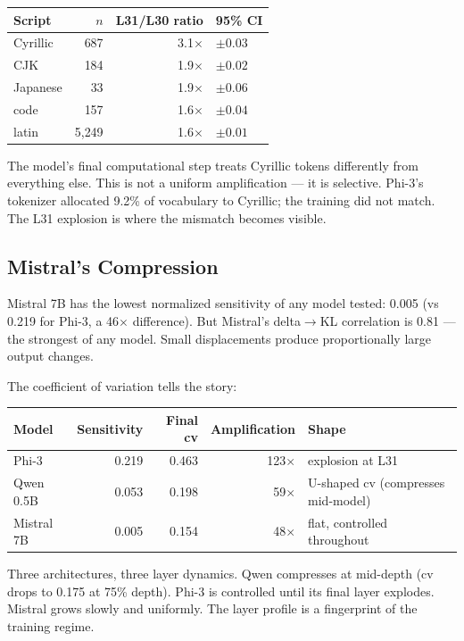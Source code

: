 \documentclass[11pt,a4paper]{article}
\begin{document}
\begin{center}
\begin{tabular}{lrrl}
\toprule
\textbf{Script} & \textbf{$n$} & \textbf{L31/L30 ratio} & \textbf{95\% CI} \\
\midrule
Cyrillic & 687 & 3.1$\times$ & $\pm 0.03$ \\
CJK & 184 & 1.9$\times$ & $\pm 0.02$ \\
Japanese & 33 & 1.9$\times$ & $\pm 0.06$ \\
code & 157 & 1.6$\times$ & $\pm 0.04$ \\
latin & 5{,}249 & 1.6$\times$ & $\pm 0.01$ \\
\bottomrule
\end{tabular}
\end{center}

The model's final computational step treats Cyrillic tokens differently from everything else. This is not a uniform amplification --- it is selective. Phi-3's tokenizer allocated 9.2\% of vocabulary to Cyrillic; the training did not match. The L31 explosion is where the mismatch becomes visible.

\subsection{Mistral's Compression}

Mistral 7B has the lowest normalized sensitivity of any model tested: 0.005 (vs 0.219 for Phi-3, a 46$\times$ difference). But Mistral's delta$\to$KL correlation is 0.81 --- the strongest of any model. Small displacements produce proportionally large output changes.

The coefficient of variation tells the story:

\begin{center}
\begin{tabular}{lrrrl}
\toprule
\textbf{Model} & \textbf{Sensitivity} & \textbf{Final cv} & \textbf{Amplification} & \textbf{Shape} \\
\midrule
Phi-3 & 0.219 & 0.463 & 123$\times$ & explosion at L31 \\
Qwen 0.5B & 0.053 & 0.198 & 59$\times$ & U-shaped cv (compresses mid-model) \\
Mistral 7B & 0.005 & 0.154 & 48$\times$ & flat, controlled throughout \\
\bottomrule
\end{tabular}
\end{center}

Three architectures, three layer dynamics. Qwen compresses at mid-depth (cv drops to 0.175 at 75\% depth). Phi-3 is controlled until its final layer explodes. Mistral grows slowly and uniformly. The layer profile is a fingerprint of the training regime.
\end{document}
